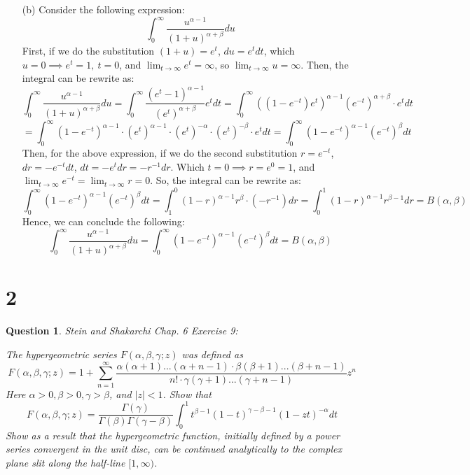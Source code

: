 \documentclass{article}
\newtheorem{question}{Question}
\begin{document}
\begin{itemize}
    \item[(b)] Consider the following expression:
    $$\int_{0}^{\infty}\frac{u^{\alpha-1}}{(1+u)^{\alpha+\beta}}du$$
    First, if we do the substitution $(1+u)=e^t$, $du=e^tdt$, which $u=0\implies e^t=1,\ t=0$, and $\lim_{t\rightarrow\infty}e^t=\infty$, so $\lim_{t\rightarrow\infty}u=\infty$. Then, the integral can be rewrite as:
    $$\int_{0}^{\infty}\frac{u^{\alpha-1}}{(1+u)^{\alpha+\beta}}du=\int_{0}^{\infty}\frac{(e^t-1)^{\alpha-1}}{(e^t)^{\alpha+\beta}}e^tdt=\int_{0}^{\infty}((1-e^{-t})e^t)^{\alpha-1}(e^{-t})^{\alpha+\beta}\cdot e^tdt$$
    $$=\int_{0}^{\infty}(1-e^{-t})^{\alpha-1}\cdot (e^{t})^{\alpha-1}\cdot (e^{t})^{-\alpha}\cdot (e^t)^{-\beta}\cdot e^tdt = \int_{0}^{\infty}(1-e^{-t})^{\alpha-1}(e^{-t})^\beta dt$$
    Then, for the above expression, if we do the second substitution $r=e^{-t}$, $dr=-e^{-t}dt$, $dt=-e^tdr = -r^{-1}dr$. Which $t=0\implies r=e^0=1$, and $\lim_{t\rightarrow\infty}e^{-t}=\lim_{t\rightarrow\infty}r=0$. So, the integral can be rewrite as:
    $$\int_{0}^{\infty}(1-e^{-t})^{\alpha-1}(e^{-t})^\beta dt=\int_{1}^{0}(1-r)^{\alpha-1}r^{\beta}\cdot (-r^{-1})dr = \int_{0}^{1}(1-r)^{\alpha-1}r^{\beta-1}dr = B(\alpha,\beta)$$
    Hence, we can conclude the following:
    $$\int_{0}^{\infty}\frac{u^{\alpha-1}}{(1+u)^{\alpha+\beta}}du=\int_{0}^{\infty}(1-e^{-t})^{\alpha-1}(e^{-t})^\beta dt=B(\alpha,\beta)$$
\end{itemize}

\hfil

\hfil

\section*{2}
\begin{myBox}[]{}
    \begin{question}
        Stein and Shakarchi Chap. 6 Exercise 9:

        The hypergeometric series $F(\alpha,\beta,\gamma; z)$ was defined as 
        $$F(\alpha,\beta,\gamma;z)=1+\sum_{n=1}^{\infty}\frac{\alpha(\alpha+1)...(\alpha+n-1)\cdot \beta(\beta+1)...(\beta+n-1)}{n!\cdot \gamma(\gamma+1)...(\gamma+n-1)}z^n$$
        Here $\alpha>0,\beta>0,\gamma>\beta$, and $|z|<1$. Show that
        $$F(\alpha,\beta,\gamma;z)=\frac{\Gamma(\gamma)}{\Gamma(\beta)\Gamma(\gamma-\beta)}\int_{0}^{1}t^{\beta-1}(1-t)^{\gamma-\beta-1}(1-zt)^{-\alpha}dt$$
        Show as a result that the hypergeometric function, initially defined by a power series convergent in the unit disc, can be continued analytically to the complex plane slit along the half-line $[1,\infty)$.
    \end{question}
\end{myBox}
\end{document}
